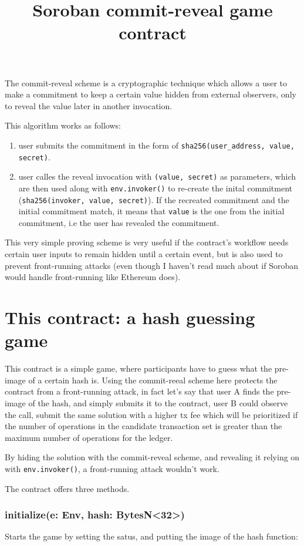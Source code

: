 \documentclass[10pt]{article}
\title{Soroban commit-reveal game contract}
\author{}
\date{}
\begin{document}
\maketitle
The commit-reveal scheme is a cryptographic technique which allows a user to make a commitment to keep a certain value hidden from external observers, only to reveal the value later in another invocation.

This algorithm works as follows:

\begin{enumerate}
  \item user submits the commitment in the form of \texttt{sha256(user\_address, value, secret)}.
  \item user calles the reveal invocation with \texttt{(value, secret)} as parameters, which are then used along with \texttt{env.invoker()} to re-create the inital commitment (\texttt{sha256(invoker, value, secret)}). If the recreated commitment and the initial commitment match, it means that \texttt{value} is the one from the initial commitment, i.e the user has revealed the commitment.
\end{enumerate}

This very simple proving scheme is very useful if the contract's workflow needs certain user inputs to remain hidden until a certain event, but is also used to prevent front-running attacks (even though I haven't read much about if Soroban would handle front-running like Ethereum does).

\section*{This contract: a hash guessing game}
This contract is a simple game, where participants have to guess what the pre-image of a certain hash is. Using the commit-reeal scheme here protects the contract from a front-running attack, in fact let's say that user A finds the pre-image of the hash, and simply submits it to the contract, user B could observe the call, submit the same solution with a higher tx fee which will be prioritized if the number of operations in the candidate transaction set is greater than the maximum number of operations for the ledger.

By hiding the solution with the commit-reveal scheme, and revealing it relying on with \texttt{env.invoker()}, a front-running attack wouldn't work.

The contract offers three methods.

\subsubsection*{initialize(e: Env, hash: BytesN<32>)}
Starts the game by setting the satus, and putting the image of the hash function:
\end{document}
